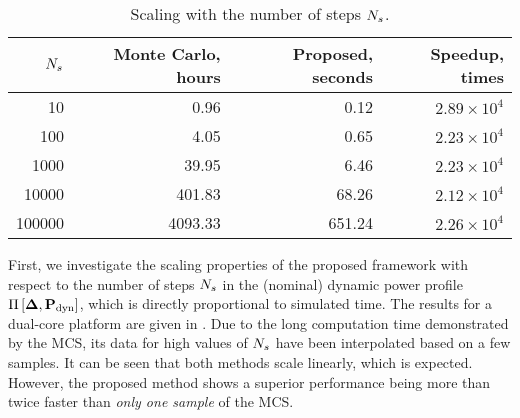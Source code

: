 \begin{table}
  \centering
  \begin{tabular}{|r|r|r|r|}
    \hline
    ${N_s}$ & Monte Carlo, hours & Proposed, seconds & Speedup, times \\
    \hline
        10 &    0.96 &   0.12 & $2.89 \times 10^4$ \\
       100 &    4.05 &   0.65 & $2.23 \times 10^4$ \\
      1000 &   39.95 &   6.46 & $2.23 \times 10^4$ \\
     10000 &  401.83 &  68.26 & $2.12 \times 10^4$ \\
    100000 & 4093.33 & 651.24 & $2.26 \times 10^4$ \\
    \hline
  \end{tabular}
  \caption{Scaling with the number of steps ${N_s}$.}
\end{table}
First, we investigate the scaling properties of the proposed framework with respect to the number of steps ${N_s}$ in the (nominal) dynamic power profile $\prof{\mP_\dyn}$, which is directly proportional to simulated time. The results for a dual-core platform are given in . Due to the long computation time demonstrated by the MCS, its data for high values of ${N_s}$ have been interpolated based on a few samples. It can be seen that both methods scale linearly, which is expected. However, the proposed method shows a superior performance being more than twice faster than \emph{only one sample} of the MCS.
